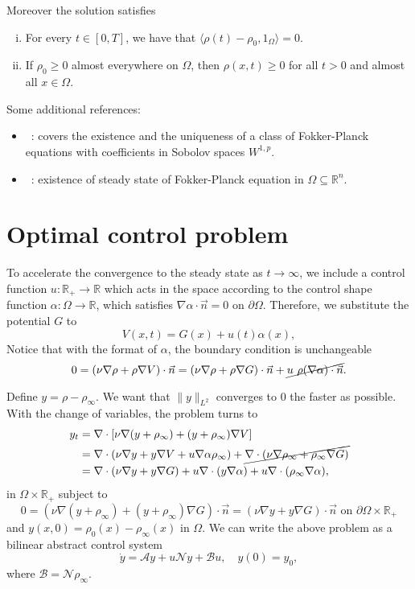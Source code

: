 \documentclass[12pt]{article}
\newcommand{\R}{\mathbb{R}}
\newcommand{\n}{\vec{n}}
\newcommand{\steady}{\rho_{\infty}}
\newcommand{\inner}[2]{\langle{} #1, #2 \rangle{}}
\theoremstyle{definition}
\begin{document}
Moreover the solution satisfies
\begin{enumerate}[(i)]
    \item For every $t \in [0,T]$, we have that $\inner{\rho(t) - \rho_0}{1_{\Omega}} = 0$.
    \item If $\rho_0 \ge 0$ almost everywhere on $\Omega$, then $\rho(x,t) \ge 0$ for all $t > 0$ and almost all $x \in \Omega$.
\end{enumerate}

Some additional references:

\begin{itemize}
    \item~\cite{bris2008existence}: covers the existence and the uniqueness of a class of Fokker-Planck equations with coefficients in Sobolov spaces $W^{1,p}$.
    \item~\cite{huang2015steady}: existence of steady state of Fokker-Planck equation in $\Omega \subseteq \R^n$.
\end{itemize}

\section{Optimal control problem}

To accelerate the convergence to the steady state as $t \to \infty$, we include a control function $u : \R_{+} \to \R$ which acts in the space according to the control shape function $\alpha : \Omega \to \R$, which satisfies $\nabla \alpha \cdot \n = 0$ on $\partial \Omega$.
Therefore, we substitute the potential $G$ to
\[
V(x,t) = G(x) + u(t) \alpha(x),
\]
Notice that with the format of $\alpha$, the boundary condition is unchangeable
\[
0 = (\nu \nabla \rho + \rho \nabla V) \cdot \n = (\nu \nabla \rho + \rho \nabla G) \cdot \n + \cancel{u~\rho (\nabla \alpha) \cdot \n}.
\]

Define $y = \rho - \steady$. 
We want that $\|y\|_{L^2}$ converges to $0$ the faster as possible. 
With the change of variables, the problem turns to
\[
\begin{split}
    y_t &= \nabla \cdot \left[\nu \nabla (y + \steady) + (y + \steady) \nabla V\right] \\
    &= \nabla \cdot \left(\nu \nabla y + y \nabla V + u\nabla \alpha \steady\right) + \cancel{\nabla \cdot (\nu \nabla \steady + \steady \nabla G)} \\
    &= \nabla \cdot (\nu \nabla y + y \nabla G) + u \nabla \cdot (y \nabla \alpha) + u \nabla \cdot (\steady \nabla \alpha),
\end{split}
\]
in $\Omega \times \R_+$ subject to 
\[
0 = (\nu \nabla (y + \steady) + (y + \steady)\nabla G) \cdot \n = (\nu \nabla y + y\nabla G) \cdot \n \text{ on } \partial \Omega \times \R_+
\]
and $y(x,0) = \rho_0(x) - \steady(x)$ in $\Omega$.
We can write the above problem as a bilinear abstract control system 
\[
\dot{y} = \mathcal{A} y + u\mathcal{N}y + \mathcal{B} u, \quad y(0) = y_0,
\]
where $\mathcal{B} = \mathcal{N} \steady$.
\end{document}
